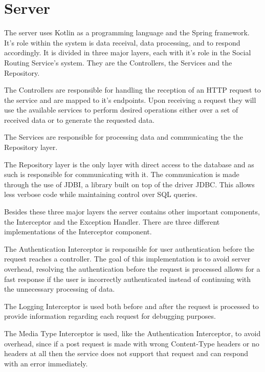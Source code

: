     \newpage

\section{Server} 
The server uses Kotlin as a programming language and the Spring framework\cite{springwebsite}. 
It's role within the system is data receival, data processing, 
and to respond accordingly. It is divided in three major layers, each with it's role in the Social Routing Service's system. 
They are the Controllers, the Services and the Repository.

The Controllers are responsible for handling the reception of an HTTP request to the service and are mapped to
it's endpoints. Upon receiving a request they will use the available services to perform desired operations either
over a set of received data or to generate the requested data.

The Services are responsible for processing data and communicating the the Repository layer.

The Repository layer is the only layer with direct access to the database and as such is responsible for communicating
with it. The communication is made through the use of JDBI\cite{jdbidocs}, a library built on top of the driver JDBC\cite{jdbcdocs}. This allows
less verbose code while maintaining control over SQL queries. 

Besides these three major layers the server contains other important components, the Interceptor\cite{springinterceptor} and the Exception Handler\cite{springexception}.
There are three different implementations of the Interceptor component.

The Authentication Interceptor is responsible for user authentication before the request reaches a controller. The goal of this
implementation is to avoid server overhead, resolving the authentication before the request is processed allows for a fast response
if the user is incorrectly authenticated instead of continuing with the unnecessary processing of data.

The Logging Interceptor is used both before and after the request is processed to provide information 
regarding each request for debugging purposes.

The Media Type Interceptor is used, like the Authentication Interceptor, to avoid overhead, since if a post request is made
with wrong Content-Type headers or no headers at all then the service does not support that request and can respond with an 
error immediately.

